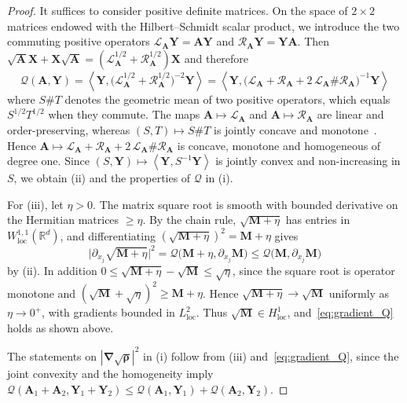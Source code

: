 \documentclass[final,reqno]{amsart}
\theoremstyle{remark}
\renewcommand{\le}{\leqslant}
\renewcommand{\ge}{\geqslant}
\newcommand{\RR}{\mathbb{R}}
\newcommand{\pscal}[1]{\left\langle #1 \right\rangle}
\newcommand{\grad}{\bm{\nabla}}
\newcommand{\LC}{\mathcal{L}}
\newcommand{\QC}{\mathcal{Q}}
\begin{document}
\begin{proof}
It suffices to consider positive definite matrices. On the space of $2\times2$ matrices endowed with the Hilbert--Schmidt scalar product, we introduce the two commuting positive operators $\LC_{\mathbf{A}}\mathbf{Y}=\mathbf{A}\mathbf{Y}$ and $\mathcal{R}_{\mathbf{A}}\mathbf{Y}=\mathbf{Y}\mathbf{A}$. Then $\sqrt{\mathbf{A}}\mathbf{X}+\mathbf{X}\sqrt{\mathbf{A}}=(\LC_{\mathbf{A}}^{1/2}+\mathcal{R}_{\mathbf{A}}^{1/2})\mathbf{X}$ and therefore
$$
\QC(\mathbf{A},\mathbf{Y})=\pscal{\mathbf{Y},\big(\LC_{\mathbf{A}}^{1/2}+\mathcal{R}_{\mathbf{A}}^{1/2}\big)^{-2}\mathbf{Y}}=\pscal{\mathbf{Y},\big(\LC_{\mathbf{A}}+\mathcal{R}_{\mathbf{A}}+2\,\LC_{\mathbf{A}}\#\mathcal{R}_{\mathbf{A}}\big)^{-1}\mathbf{Y}}
$$
where $S\#T$ denotes the geometric mean of two positive operators, which equals $S^{1/2}T^{1/2}$ when they commute. The maps $\mathbf{A}\mapsto\LC_{\mathbf{A}}$ and $\mathbf{A}\mapsto\mathcal{R}_{\mathbf{A}}$ are linear and order-preserving, whereas $(S,T)\mapsto S\#T$ is jointly concave and monotone~\cite{ando1979concavity,kubo1980means}. Hence $\mathbf{A}\mapsto \LC_{\mathbf{A}}+\mathcal{R}_{\mathbf{A}}+2\,\LC_{\mathbf{A}}\#\mathcal{R}_{\mathbf{A}}$ is concave, monotone and homogeneous of degree one. Since $(S,\mathbf{Y})\mapsto\pscal{\mathbf{Y},S^{-1}\mathbf{Y}}$ is jointly convex and non-increasing in $S$, we obtain (ii) and the properties of $\QC$ in (i).

For (iii), let $\eta>0$. The matrix square root is smooth with bounded derivative on the Hermitian matrices $\ge\eta$. By the chain rule, $\sqrt{\mathbf{M}+\eta}$ has entries in $W^{1,1}_{\mathrm{loc}}(\RR^d)$, and differentiating $(\sqrt{\mathbf{M}+\eta})^2=\mathbf{M}+\eta$ gives
$$
\big|\partial_{x_j}\sqrt{\mathbf{M}+\eta}\big|^2=\QC\big(\mathbf{M}+\eta,\partial_{x_j}\mathbf{M}\big)\le\QC\big(\mathbf{M},\partial_{x_j}\mathbf{M}\big)
$$
by (ii). In addition $0\le\sqrt{\mathbf{M}+\eta}-\sqrt{\mathbf{M}}\le\sqrt\eta$, since the square root is operator monotone and $(\sqrt{\mathbf{M}}+\sqrt\eta)^2\ge\mathbf{M}+\eta$. Hence $\sqrt{\mathbf{M}+\eta}\to\sqrt{\mathbf{M}}$ uniformly as $\eta\to0^+$, with gradients bounded in $L^2_{\mathrm{loc}}$. Thus $\sqrt{\mathbf{M}}\in H^1_{\mathrm{loc}}$, and~\cref{eq:gradient_Q} holds as shown above.

The statements on $|\grad\sqrt{\bm{\rho}}|^2$ in (i) follow from (iii) and~\cref{eq:gradient_Q}, since the joint convexity and the homogeneity imply $\QC(\mathbf{A}_1+\mathbf{A}_2,\mathbf{Y}_1+\mathbf{Y}_2)\le\QC(\mathbf{A}_1,\mathbf{Y}_1)+\QC(\mathbf{A}_2,\mathbf{Y}_2)$.
\end{proof}
\end{document}
